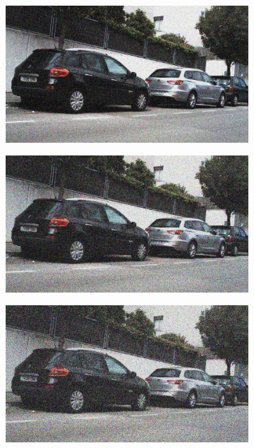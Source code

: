 \documentclass[a4paper]{ctexart}
\begin{document}
\begin{figure}[htbp]
\begin{subfigure}{0.08\textwidth}
			\label{fig：Gamma=0.5, Gauss Noise = 0.1}
		\end{subfigure}
		\begin{subfigure}{0.08\textwidth}
			\captionsetup{font=scriptsize}
			\includegraphics[width=\linewidth]{picture/Edge Detection/degrade/RGB_001 Gamma=0.5, Gauss Noise=0.2}
			\label{fig：Gamma=0.5, Gauss Noise = 0.2}
		\end{subfigure}
		\begin{subfigure}{0.08\textwidth}
			\captionsetup{font=scriptsize}
			\includegraphics[width=\linewidth]{picture/Edge Detection/degrade/RGB_001 Gamma=0.5, Gauss Noise=0.3}
			\label{fig：Gamma=0.5, Gauss Noise = 0.3}
		\end{subfigure}
		\begin{subfigure}{0.08\textwidth}
			\captionsetup{font=scriptsize}
			\includegraphics[width=\linewidth]{picture/Edge Detection/degrade/RGB_001 Gamma=0.5, Gauss Noise=0.4}

\end{subfigure}
\end{figure}
\end{document}
